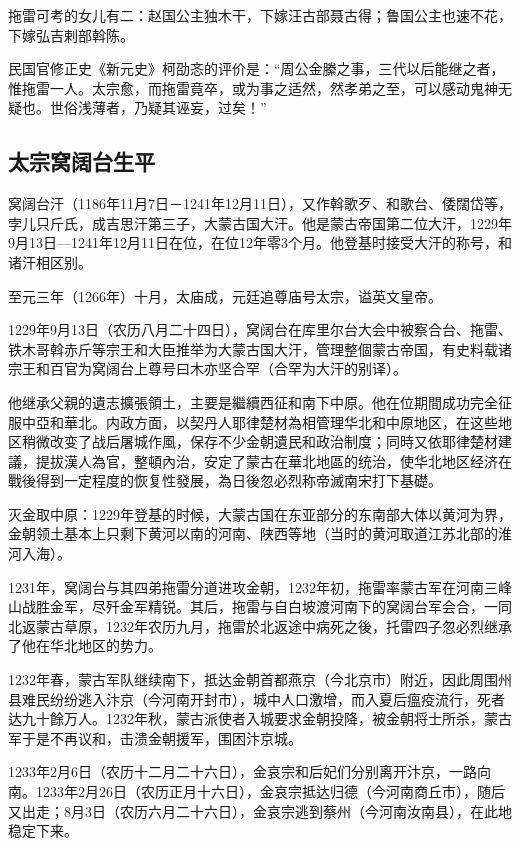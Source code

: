 拖雷可考的女儿有二：赵国公主独木干，下嫁汪古部聂古得；鲁国公主也速不花，下嫁弘吉剌部斡陈。

民国官修正史《新元史》柯劭忞的评价是：“周公金縢之事，三代以后能继之者，惟拖雷一人。太宗愈，而拖雷竟卒，或为事之适然，然孝弟之至，可以感动鬼神无疑也。世俗浅薄者，乃疑其诬妄，过矣！”

\subsection{太宗窝阔台生平}

窝阔台汗（1186年11月7日－1241年12月11日），又作斡歌歹、和歌台、倭闊岱等，孛儿只斤氏，成吉思汗第三子，大蒙古国大汗。他是蒙古帝国第二位大汗，1229年9月13日—1241年12月11日在位，在位12年零3个月。他登基时接受大汗的称号，和诸汗相区别。

至元三年（1266年）十月，太庙成，元廷追尊庙号太宗，谥英文皇帝。

1229年9月13日（农历八月二十四日），窝阔台在库里尔台大会中被察合台、拖雷、铁木哥斡赤斤等宗王和大臣推举为大蒙古国大汗，管理整個蒙古帝国，有史料载诸宗王和百官为窝阔台上尊号曰木亦坚合罕（合罕为大汗的别译）。

他继承父親的遺志擴張領土，主要是繼續西征和南下中原。他在位期間成功完全征服中亞和華北。内政方面，以契丹人耶律楚材為相管理华北和中原地区，在这些地区稍微改变了战后屠城作風，保存不少金朝遺民和政治制度；同時又依耶律楚材建議，提拔漢人為官，整頓內治，安定了蒙古在華北地區的统治，使华北地区经济在戰後得到一定程度的恢复性發展，為日後忽必烈称帝滅南宋打下基礎。

灭金取中原：1229年登基的时候，大蒙古国在东亚部分的东南部大体以黄河为界，金朝领土基本上只剩下黄河以南的河南、陕西等地（当时的黄河取道江苏北部的淮河入海）。

1231年，窝阔台与其四弟拖雷分道进攻金朝，1232年初，拖雷率蒙古军在河南三峰山战胜金军，尽歼金军精锐。其后，拖雷与自白坡渡河南下的窝阔台军会合，一同北返蒙古草原，1232年农历九月，拖雷於北返途中病死之後，托雷四子忽必烈继承了他在华北地区的势力。

1232年春，蒙古军队继续南下，抵达金朝首都燕京（今北京市）附近，因此周围州县难民纷纷逃入汴京（今河南开封市），城中人口激增，而入夏后瘟疫流行，死者达九十餘万人。1232年秋，蒙古派使者入城要求金朝投降，被金朝将士所杀，蒙古军于是不再议和，击溃金朝援军，围困汴京城。

1233年2月6日（农历十二月二十六日），金哀宗和后妃们分别离开汴京，一路向南。1233年2月26日（农历正月十六日），金哀宗抵达归德（今河南商丘市），随后又出走；8月3日（农历六月二十六日），金哀宗逃到蔡州（今河南汝南县），在此地稳定下来。

